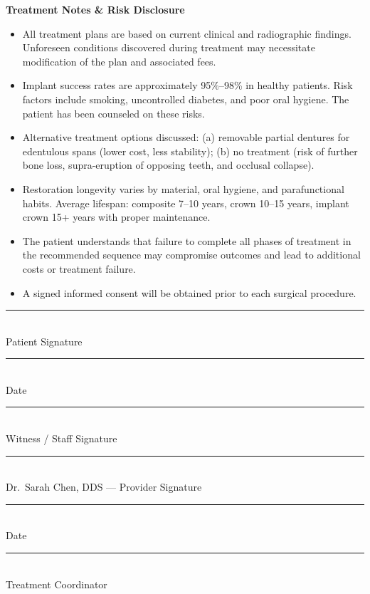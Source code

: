 \documentclass[11pt,a4paper]{article}
\begin{document}
\begin{tcolorbox}[
  colback=primary!5,
  colframe=primary!20,
  arc=3mm,
  boxrule=0.5pt,
  left=5mm,
  right=5mm,
  top=4mm,
  bottom=4mm,
]
  {\bfseries\color{primary}Treatment Notes \& Risk Disclosure}\\[2mm]
  \small
  \begin{itemize}[nosep, leftmargin=*, itemsep=1pt]
    \item All treatment plans are based on current clinical and radiographic findings. Unforeseen conditions discovered during treatment may necessitate modification of the plan and associated fees.
    \item Implant success rates are approximately 95\%--98\% in healthy patients. Risk factors include smoking, uncontrolled diabetes, and poor oral hygiene. The patient has been counseled on these risks.
    \item Alternative treatment options discussed: (a) removable partial dentures for edentulous spans (lower cost, less stability); (b) no treatment (risk of further bone loss, supra-eruption of opposing teeth, and occlusal collapse).
    \item Restoration longevity varies by material, oral hygiene, and parafunctional habits. Average lifespan: composite 7--10 years, crown 10--15 years, implant crown 15+ years with proper maintenance.
    \item The patient understands that failure to complete all phases of treatment in the recommended sequence may compromise outcomes and lead to additional costs or treatment failure.
    \item A signed informed consent will be obtained prior to each surgical procedure.
  \end{itemize}
\end{tcolorbox}

\vspace{5mm}

\begin{minipage}[t]{0.48\textwidth}
  \vspace{5mm}
  \rule{\linewidth}{0.4pt}\\[1mm]
  {\small\color{softgray}Patient Signature}\\[8mm]
  \rule{\linewidth}{0.4pt}\\[1mm]
  {\small\color{softgray}Date}\\[8mm]
  \rule{\linewidth}{0.4pt}\\[1mm]
  {\small\color{softgray}Witness / Staff Signature}
\end{minipage}\hfill%
\begin{minipage}[t]{0.48\textwidth}
  \vspace{5mm}
  \rule{\linewidth}{0.4pt}\\[1mm]
  {\small\color{softgray}Dr.\ Sarah Chen, DDS --- Provider Signature}\\[8mm]
  \rule{\linewidth}{0.4pt}\\[1mm]
  {\small\color{softgray}Date}\\[8mm]
  \rule{\linewidth}{0.4pt}\\[1mm]
  {\small\color{softgray}Treatment Coordinator}
\end{minipage}
\end{document}
